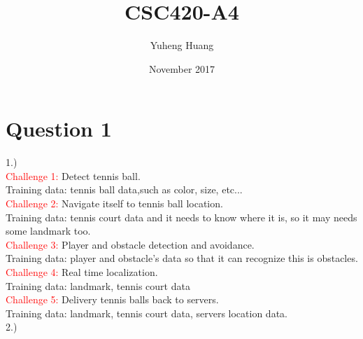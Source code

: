 \documentclass[12pt]{article}
\title{CSC420-A4}
\author{Yuheng Huang }
\date{November 2017}
\begin{document}
\maketitle

\section*{Question 1}
1.)\\
    
    \textcolor{red}{Challenge 1:} Detect tennis ball.\\
    
    Training data: tennis ball data,such as color, size, etc...\\
    
    \textcolor{red}{Challenge 2:} Navigate itself to tennis ball location.\\
    
    Training data: tennis court data and it needs to know where it is, so it may needs some landmark too.\\
    
    \textcolor{red}{Challenge 3:} Player and obstacle detection and avoidance.\\
    
    Training data: player and obstacle's data so that it can recognize this is obstacles.\\
    
    \textcolor{red}{Challenge 4:} Real time localization.\\
    
    Training data: landmark, tennis court data\\
    
    \textcolor{red}{Challenge 5:} Delivery tennis balls back to servers.\\
    
    Training data: landmark, tennis court data, servers location data.\\[5mm]
2.)\\
\end{document}
